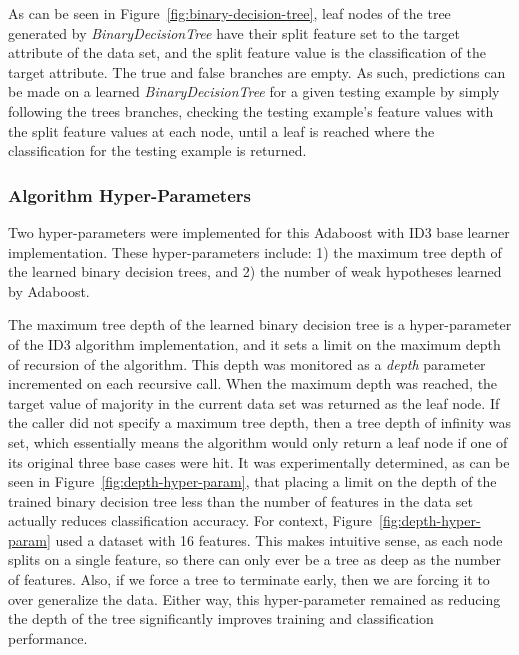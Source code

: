 \documentclass[a4paper]{article}
\begin{document}
As can be seen in Figure~\ref{fig:binary-decision-tree}, leaf nodes of the tree generated by \textit{BinaryDecisionTree} have their split feature set to the target attribute of the data set, and the split feature value is the classification of the target attribute. The true and false branches are empty. As such, predictions can be made on a learned \textit{BinaryDecisionTree} for a given testing example by simply following the trees branches, checking the testing example's feature values with the split feature values at each node, until a leaf is reached where the classification for the testing example is returned.

\subsubsection{Algorithm Hyper-Parameters}
Two hyper-parameters were implemented for this Adaboost with ID3 base learner implementation. These hyper-parameters include: 1) the maximum tree depth of the learned binary decision trees, and 2) the number of weak hypotheses learned by Adaboost. 

The maximum tree depth of the learned binary decision tree is a hyper-parameter of the ID3 algorithm implementation, and it sets a limit on the maximum depth of recursion of the algorithm. This depth was monitored as a \textit{depth} parameter incremented on each recursive call. When the maximum depth was reached, the target value of majority in the current data set was returned as the leaf node. If the caller did not specify a maximum tree depth, then a tree depth of infinity was set, which essentially means the algorithm would only return a leaf node if one of its original three base cases were hit. It was experimentally determined, as can be seen in Figure~\ref{fig:depth-hyper-param}, that placing a limit on the depth of the trained binary decision tree less than the number of features in the data set actually reduces classification accuracy. For context, Figure~\ref{fig:depth-hyper-param} used a dataset with 16 features. This makes intuitive sense, as each node splits on a single feature, so there can only ever be a tree as deep as the number of features. Also, if we force a tree to terminate early, then we are forcing it to over generalize the data. Either way, this hyper-parameter remained as reducing the depth of the tree significantly improves training and classification performance. 
\end{document}
